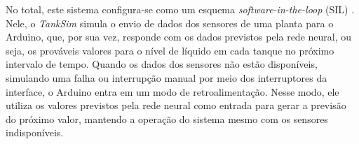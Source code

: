 

No total, este sistema configura-se como um esquema \textit{software-in-the-loop} (SIL) \citep{chen_2008}. Nele, o \textit{TankSim} simula o envio de dados dos sensores de uma planta para o Arduino, que, por sua vez, responde com os dados previstos pela rede neural, ou seja, os prováveis valores para o nível de líquido em cada tanque no próximo intervalo de tempo. Quando os dados dos sensores não estão disponíveis, simulando uma falha ou interrupção manual por meio dos interruptores da interface, o Arduino entra em um modo de retroalimentação. Nesse modo, ele utiliza os valores previstos pela rede neural como entrada para gerar a previsão do próximo valor, mantendo a operação do sistema mesmo com os sensores indisponíveis.
